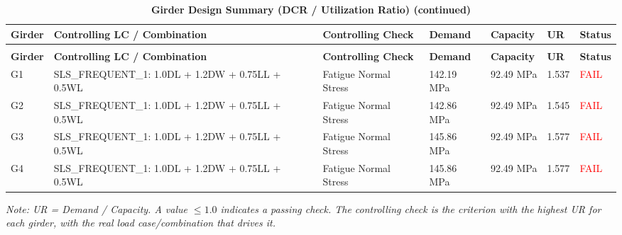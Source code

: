 \documentclass[12pt,a4paper]{report}
\numberwithin{table}{chapter}
\numberwithin{figure}{chapter}
\begin{document}
\vspace{1em}
\vspace{0.4em}
\begin{longtable}{|C{1.6cm}|>{\centering\arraybackslash}p{3.6cm}|C{2.4cm}|C{2.0cm}|C{2.1cm}|C{1.7cm}|C{1.5cm}|}
\caption{\textbf{Girder Design Summary (DCR / Utilization Ratio)}}\\
\hline
\textbf{Girder} & \textbf{Controlling LC / Combination} & \textbf{Controlling Check} & \textbf{Demand} & \textbf{Capacity} & \textbf{UR} & \textbf{Status} \\[6pt]
\hline
\endfirsthead
\caption[]{\textbf{Girder Design Summary (DCR / Utilization Ratio) (continued)}}\\
\hline
\textbf{Girder} & \textbf{Controlling LC / Combination} & \textbf{Controlling Check} & \textbf{Demand} & \textbf{Capacity} & \textbf{UR} & \textbf{Status} \\[6pt]
\hline
\endhead
\hline
\endfoot
\endlastfoot
G1 & SLS\_\allowbreak{}FREQUENT\_\allowbreak{}1:\allowbreak{} 1.0DL + 1.2DW + 0.75LL + 0.5WL & Fatigue Normal Stress & 142.19 MPa & 92.49 MPa & 1.537 & \textcolor{red}{FAIL} \\[6pt]
\hline
G2 & SLS\_\allowbreak{}FREQUENT\_\allowbreak{}1:\allowbreak{} 1.0DL + 1.2DW + 0.75LL + 0.5WL & Fatigue Normal Stress & 142.86 MPa & 92.49 MPa & 1.545 & \textcolor{red}{FAIL} \\[6pt]
\hline
G3 & SLS\_\allowbreak{}FREQUENT\_\allowbreak{}1:\allowbreak{} 1.0DL + 1.2DW + 0.75LL + 0.5WL & Fatigue Normal Stress & 145.86 MPa & 92.49 MPa & 1.577 & \textcolor{red}{FAIL} \\[6pt]
\hline
G4 & SLS\_\allowbreak{}FREQUENT\_\allowbreak{}1:\allowbreak{} 1.0DL + 1.2DW + 0.75LL + 0.5WL & Fatigue Normal Stress & 145.86 MPa & 92.49 MPa & 1.577 & \textcolor{red}{FAIL} \\[6pt]
\hline
\end{longtable}
\noindent\textit{Note: UR = Demand / Capacity. A value $\leq 1.0$ indicates a passing check. The controlling check is the criterion with the highest UR for each girder, with the real load case/combination that drives it.}

\vspace{1em}
\end{document}
